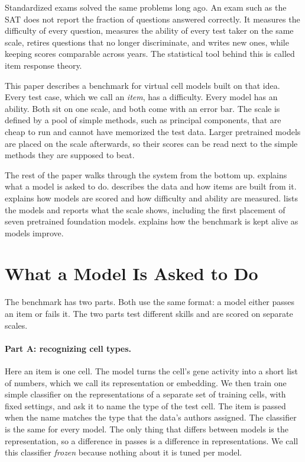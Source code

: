 \documentclass[]{style}
\begin{document}
Standardized exams solved the same problems long ago. An exam such as the SAT does not
report the fraction of questions answered correctly. It measures the difficulty of every
question, measures the ability of every test taker on the same scale, retires questions
that no longer discriminate, and writes new ones, while keeping scores comparable across
years. The statistical tool behind this is called item response theory.

This paper describes a benchmark for virtual cell models built on that idea. Every test
case, which we call an \emph{item}, has a difficulty. Every model has an ability. Both
sit on one scale, and both come with an error bar. The scale is defined by a pool of simple
methods, such as principal components, that are cheap to run and cannot have memorized the
test data. Larger pretrained models are placed on the scale afterwards, so their scores can
be read next to the simple methods they are supposed to beat.

The rest of the paper walks through the system from the bottom up. 
explains what a model is asked to do.  describes the data and how items
are built from it.  explains how models are scored and how difficulty and
ability are measured.  lists the models and reports what the scale shows,
including the first placement of seven pretrained foundation models. 
explains how the benchmark is kept alive as models improve.

\section{What a Model Is Asked to Do}
\label{sec:items}

The benchmark has two parts. Both use the same format: a model either passes an item or
fails it. The two parts test different skills and are scored on separate scales.

\paragraph{Part A: recognizing cell types.}
Here an item is one cell. The model turns the cell's gene activity into a short list of
numbers, which we call its representation or embedding. We then train one simple
classifier on the representations of a separate set of training cells, with fixed
settings, and ask it to name the type of the test cell. The item is passed when the name
matches the type that the data's authors assigned. The classifier is the same for every
model. The only thing that differs between models is the representation, so a difference
in passes is a difference in representations. We call this classifier \emph{frozen}
because nothing about it is tuned per model.
\end{document}

